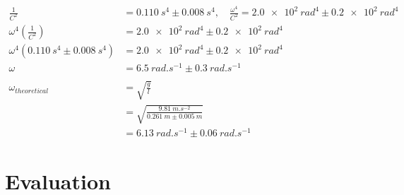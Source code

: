 \documentclass[letterpaper, 12pt]{article}
\begin{document}
\begin{align*}
    \frac{1}{C^2}                                  & = \SI{0.110}{s^4} \pm \SI{0.008}{s^4},\quad \frac{\omega^4}{C^2} = \SI{2.0e2}{rad^4} \pm \SI{0.2e2}{rad^4}
    \\
    \omega^4 \left( \frac{1}{C^2} \right)          & = \SI{2.0e2}{rad^4} \pm \SI{0.2e2}{rad^4}
    \\
    \omega^4 (\SI{0.110}{s^4} \pm \SI{0.008}{s^4}) & = \SI{2.0e2}{rad^4} \pm \SI{0.2e2}{rad^4}
    \\
    \omega                                         & = \SI{6.5}{rad.s^{-1}} \pm \SI{0.3}{rad.s^{-1}}
    \\
    \\
    \omega_{theoretical}                           & = \sqrt{\frac{g}{l}}
    \\
                                                   & = \sqrt{\frac{\SI{9.81}{m.s^{-2}}}{\SI{0.261}{m} \pm \SI{0.005}{m}}}
    \\
                                                   & = \SI{6.13}{rad.s^{-1}} \pm \SI{0.06}{rad.s^{-1}}
\end{align*}

\section{Evaluation}





\end{document}
